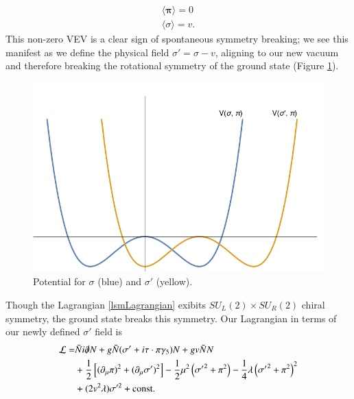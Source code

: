 \documentclass[aps,prd,onecolumn,showpacs,amsmath,amssymb,nofootinbib]{revtex4} \pdfoutput=1
\begin{document}
\begin{gather}
    \langle \mathbf{\pi} \rangle = 0  \\
    \langle \sigma \rangle = v.
\end{gather}
This non-zero VEV is a clear sign of spontaneous symmetry breaking; we see this manifest as we define the physical field $\sigma'=\sigma -v$, aligning to our new vacuum and therefore breaking the rotational symmetry of the ground state (Figure \ref{fig:shiftedpotential}). 
\begin{figure}
    \centering
    \includegraphics[scale=0.75]{shiftedpotential.pdf}
    \caption{Potential for $\sigma$ (blue) and $\sigma'$ (yellow).}
    \label{fig:shiftedpotential}
\end{figure}
Though the Lagrangian \eqref{lsmLagrangian} exibits ${S\!U}_L(2)\times {S\!U}_R(2)$ chiral symmetry, the ground state breaks this symmetry. Our Lagrangian in terms of our newly defined $\sigma'$ field is
\begin{align}
    \label{lsmLagrangianSSB}
      \mathcal{L} = & \bar{N}i \slashed{\partial}N + g\bar{N}(\sigma' + i \mathbf{\tau \cdot \pi}\gamma_{5})N + gv\bar{N}N\\ & +\frac{1}{2}\left[(\partial_{\mu}\mathbf{\pi})^{2}+(\partial_{\mu}\mathbf{\sigma'})^{2}\right]-\frac{1}{2}\mu^2\left({\sigma'}^2+\mathbf{\pi}^2\right) -\frac{1}{4}\lambda\left({\sigma'}^2+\mathbf{\pi}^2\right)^2\\
      & + (2v^2\lambda)\sigma'^2 + \mathrm{const.}
\end{align}
\end{document}
